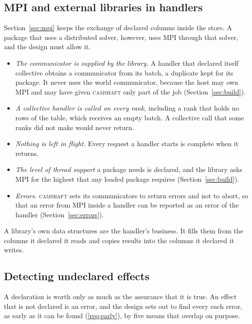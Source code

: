 \documentclass[11pt,a4paper]{article}
\newcommand{\camshaft}{\textsc{camshaft}}
\begin{document}
\subsection{MPI and external libraries in handlers}
\label{sec:handler-mpi}

Section~\ref{sec:mpi} keeps the exchange of declared columns inside the
store.  A package that uses a distributed solver, however, uses MPI through
that solver, and the design must allow it.

\begin{itemize}
  \item \emph{The communicator is supplied by the library.}  A handler that
        declared itself collective obtains a communicator from its batch,
        a duplicate kept for its package.  It never uses the world
        communicator, because the host may own MPI and may have given
        \camshaft{} only part of the job (Section~\ref{sec:build}).
  \item \emph{A collective handler is called on every rank,} including a
        rank that holds no rows of the table, which receives an empty batch.
        A collective call that some ranks did not make would never return.
  \item \emph{Nothing is left in flight.}  Every request a handler starts is
        complete when it returns.
  \item \emph{The level of thread support} a package needs is declared, and
        the library asks MPI for the highest that any loaded package
        requires (Section~\ref{sec:build}).
  \item \emph{Errors.}  \camshaft{} sets its communicators to return errors
        and not to abort, so that an error from MPI inside a handler can be
        reported as an error of the handler (Section~\ref{sec:errors}).
\end{itemize}

A library's own data structures are the handler's business.  It fills them
from the columns it declared it reads and copies results into the columns
it declared it writes.

\subsection{Detecting undeclared effects}
\label{sec:undeclared}

A declaration is worth only as much as the assurance that it is true.  An
effect that is not declared is an error, and the design sets out to find
every such error, as early as it can be found (\ref{req:early}), by five
means that overlap on purpose.
\end{document}
